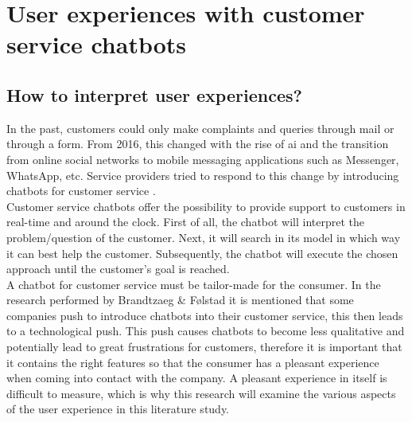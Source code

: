 \section{User experiences with customer service chatbots}
\subsection{How to interpret user experiences?}
In the past, customers could only make complaints and queries through mail or through a form. From 2016, this changed with the rise of \acrshort{ai} and the transition from online social networks to mobile messaging applications such as Messenger, WhatsApp, etc. Service providers tried to respond to this change by introducing chatbots for customer service \citep{Brandtzaeg2018}.\\
\break
Customer service chatbots offer the possibility to provide support to customers in real-time and around the clock. First of all, the chatbot will interpret the problem/question of the customer. Next, it will search in its model in which way it can best help the customer. Subsequently, the chatbot will execute the chosen approach until the customer's goal is reached.\\
\break
A chatbot for customer service must be tailor-made for the consumer. In the research performed by Brandtzaeg \& Følstad \citep{Brandtzaeg2018} it is mentioned that some companies push to introduce chatbots into their customer service, this then leads to a technological push. This push causes chatbots to become less qualitative and potentially lead to great frustrations for customers, therefore it is important that it contains the right features so that the consumer has a pleasant experience when coming into contact with the company. A pleasant experience in itself is difficult to measure, which is why this research will examine the various aspects of the user experience in this literature study.\\

